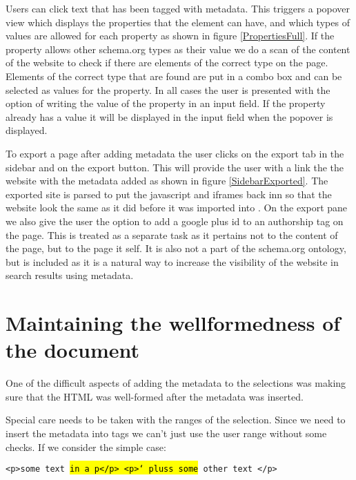 Users can click text that has been tagged with metadata.
This triggers a popover view which displays the properties that the element can have,
and which types of values are allowed for each property as shown in figure \ref{PropertiesFull}.
If the property allows other schema.org types as their value we do a scan of the content of the website to check if
there are elements of the correct type on the page.
Elements of the correct type that are found are put in a combo box and can be selected as values for the property.
In all cases the user is presented with the option of writing the value of the property in an input field.
If the property already has a value it will be displayed in the input field when the popover is displayed.

To export a page after adding metadata the user clicks on the export tab in the sidebar and on the export button.
This will provide the user with a link the the website with the metadata added as shown in figure \ref{SidebarExported}.
The exported site is parsed to put the javascript and iframes back inn so that the website look the same as it did
before it was imported into \theartefact.
On the export pane we also give the user the option to add a google plus id to an authorship tag on the page.
This is treated as a separate task as it pertains not to the content of the page, but to the page it self.
It is also not a part of the schema.org ontology, but is included as it is a natural way to increase the visibility of
the website in search results using metadata.





\section{Maintaining the wellformedness of the document}
One of the difficult aspects of adding the metadata to the selections was making sure that the HTML was well-formed
after the metadata was inserted.

Special care needs to be taken with the ranges of the selection.
Since we need to insert the metadata into tags we can't just use the user range without some checks.
If we consider the simple case:

\texttt{<p>some text \hl{in a p</p> <p>` pluss some} other text </p>}


